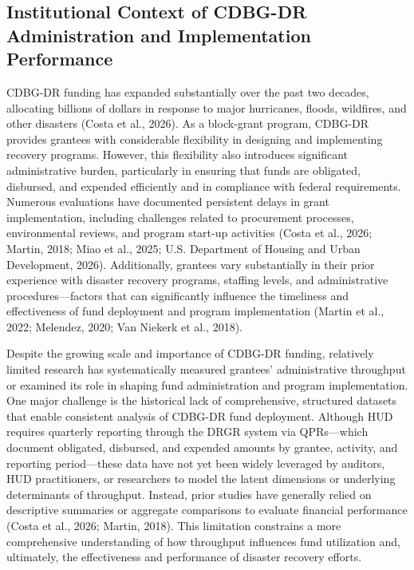 \documentclass[
  number]{elsarticle}
\begin{document}
\subsection{Institutional Context of CDBG-DR Administration and
Implementation
Performance}\label{institutional-context-of-cdbg-dr-administration-and-implementation-performance}

CDBG-DR funding has expanded substantially over the past two decades,
allocating billions of dollars in response to major hurricanes, floods,
wildfires, and other disasters (Costa et al., 2026). As a block-grant
program, CDBG-DR provides grantees with considerable flexibility in
designing and implementing recovery programs. However, this flexibility
also introduces significant administrative burden, particularly in
ensuring that funds are obligated, disbursed, and expended efficiently
and in compliance with federal requirements. Numerous evaluations have
documented persistent delays in grant implementation, including
challenges related to procurement processes, environmental reviews, and
program start-up activities (Costa et al., 2026; Martin, 2018; Miao et
al., 2025; U.S. Department of Housing and Urban Development, 2026).
Additionally, grantees vary substantially in their prior experience with
disaster recovery programs, staffing levels, and administrative
procedures---factors that can significantly influence the timeliness and
effectiveness of fund deployment and program implementation (Martin et
al., 2022; Melendez, 2020; Van Niekerk et al., 2018).

Despite the growing scale and importance of CDBG-DR funding, relatively
limited research has systematically measured grantees' administrative
throughput or examined its role in shaping fund administration and
program implementation. One major challenge is the historical lack of
comprehensive, structured datasets that enable consistent analysis of
CDBG-DR fund deployment. Although HUD requires quarterly reporting
through the DRGR system via QPRs---which document obligated, disbursed,
and expended amounts by grantee, activity, and reporting period---these
data have not yet been widely leveraged by auditors, HUD practitioners,
or researchers to model the latent dimensions or underlying determinants
of throughput. Instead, prior studies have generally relied on
descriptive summaries or aggregate comparisons to evaluate financial
performance (Costa et al., 2026; Martin, 2018). This limitation
constrains a more comprehensive understanding of how throughput
influences fund utilization and, ultimately, the effectiveness and
performance of disaster recovery efforts.
\end{document}
